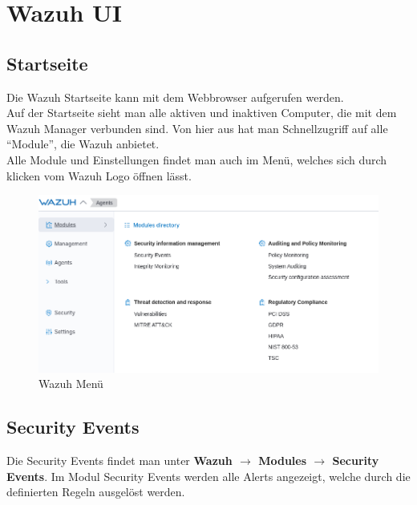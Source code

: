 \chapter{Wazuh UI}
\section{Startseite}
Die Wazuh Startseite kann mit dem Webbrowser aufgerufen werden.\\

Auf der Startseite sieht man alle aktiven und inaktiven Computer, die mit dem Wazuh Manager verbunden sind.
Von hier aus hat man Schnellzugriff auf alle ``Module'', die Wazuh anbietet.\\

Alle Module und Einstellungen findet man auch im Menü, welches sich durch klicken vom Wazuh Logo öffnen lässt.
\begin{figure}[H]
    \centering
    \includegraphics[width=\linewidth]{../img/wazuh-menu.png}
    \caption{Wazuh Menü}
\end{figure}

\section{Security Events}
Die Security Events findet man unter \textbf{Wazuh $\rightarrow$ Modules $\rightarrow$ Security Events}.
Im Modul Security Events werden alle Alerts angezeigt, welche durch die definierten Regeln ausgelöst werden.

